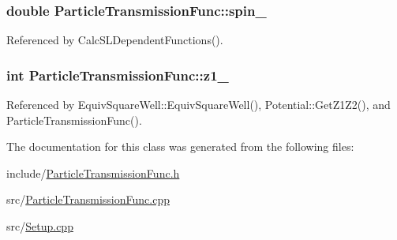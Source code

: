 \hypertarget{classParticleTransmissionFunc_a3143aef2c113158fca1643a2505f0b9a}{
\subsubsection[{spin\-\_\-}]{\setlength{\rightskip}{0pt plus 5cm}double Particle\-Transmission\-Func\-::spin\-\_\-\hspace{0.3cm}{\ttfamily [protected]}}}\label{classParticleTransmissionFunc_a3143aef2c113158fca1643a2505f0b9a}


Referenced by Calc\-S\-L\-Dependent\-Functions().

\hypertarget{classParticleTransmissionFunc_a4c11b86051f613e37b10c692ea9746ce}{
\subsubsection[{z1\-\_\-}]{\setlength{\rightskip}{0pt plus 5cm}int Particle\-Transmission\-Func\-::z1\-\_\-\hspace{0.3cm}{\ttfamily [protected]}}}\label{classParticleTransmissionFunc_a4c11b86051f613e37b10c692ea9746ce}


Referenced by Equiv\-Square\-Well\-::\-Equiv\-Square\-Well(), Potential\-::\-Get\-Z1\-Z2(), and Particle\-Transmission\-Func().



The documentation for this class was generated from the following files\-:\begin{DoxyCompactItemize}
\item 
include/\hyperlink{ParticleTransmissionFunc_8h}{Particle\-Transmission\-Func.\-h}\item 
src/\hyperlink{ParticleTransmissionFunc_8cpp}{Particle\-Transmission\-Func.\-cpp}\item 
src/\hyperlink{Setup_8cpp}{Setup.\-cpp}\end{DoxyCompactItemize}
